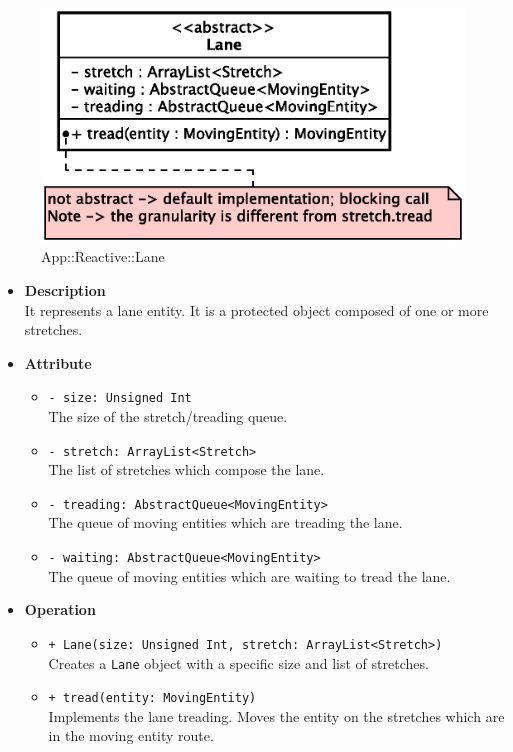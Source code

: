 \begin{figure}[h]
\centering
\includegraphics[scale=0.6,keepaspectratio]{images/solution/lane.eps}
\caption{App::Reactive::Lane}
\label{fig:sd-app-lane}
\end{figure}
\FloatBarrier
\begin{itemize}
  \item \textbf{Description} \\
    It represents a lane entity. It is a protected object composed of one or
    more stretches.
  \item \textbf{Attribute}
  \begin{itemize}
    \item \texttt{- size: Unsigned Int} \\
The size of the stretch/treading queue.
    \item \texttt{- stretch: ArrayList<Stretch>} \\
The list of stretches which compose the lane.
    \item \texttt{- treading: AbstractQueue<MovingEntity>} \\
The queue of moving entities which are treading the lane.
    \item \texttt{- waiting: AbstractQueue<MovingEntity>} \\
The queue of moving entities which are waiting to tread the lane. 
  \end{itemize}
  \item \textbf{Operation}
  \begin{itemize} 
    \item \texttt{+ Lane(size: Unsigned Int, stretch: ArrayList<Stretch>)} \\
Creates a \texttt{Lane} object with a specific size and list of stretches.
    \item \texttt{+ tread(entity: MovingEntity)} \\
Implements the lane treading. Moves the entity on the stretches which are 
in the moving entity route.
  \end{itemize}
\end{itemize}
